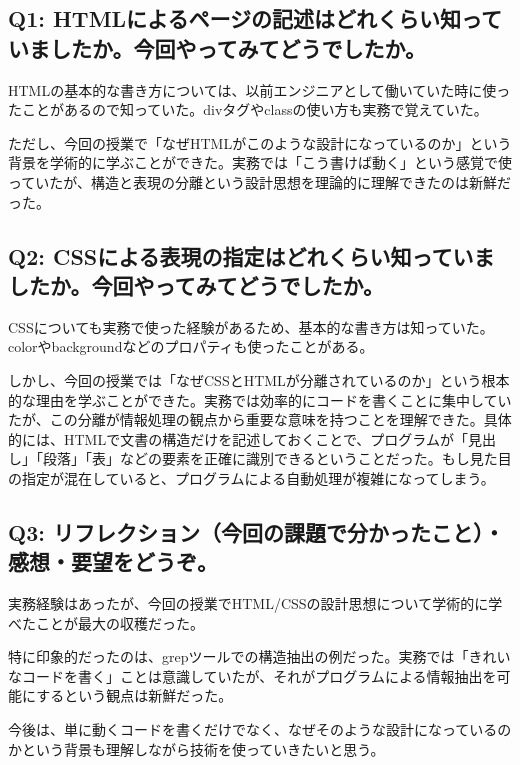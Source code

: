 \documentclass[12pt,a4j]{jarticle}
\begin{document}
\subsection{Q1: HTMLによるページの記述はどれくらい知っていましたか。今回やってみてどうでしたか。}

HTMLの基本的な書き方については、以前エンジニアとして働いていた時に使ったことがあるので知っていた。divタグやclassの使い方も実務で覚えていた。

ただし、今回の授業で「なぜHTMLがこのような設計になっているのか」という背景を学術的に学ぶことができた。実務では「こう書けば動く」という感覚で使っていたが、構造と表現の分離という設計思想を理論的に理解できたのは新鮮だった。

\subsection{Q2: CSSによる表現の指定はどれくらい知っていましたか。今回やってみてどうでしたか。}

CSSについても実務で使った経験があるため、基本的な書き方は知っていた。colorやbackgroundなどのプロパティも使ったことがある。

しかし、今回の授業では「なぜCSSとHTMLが分離されているのか」という根本的な理由を学ぶことができた。実務では効率的にコードを書くことに集中していたが、この分離が情報処理の観点から重要な意味を持つことを理解できた。具体的には、HTMLで文書の構造だけを記述しておくことで、プログラムが「見出し」「段落」「表」などの要素を正確に識別できるということだった。もし見た目の指定が混在していると、プログラムによる自動処理が複雑になってしまう。

\subsection{Q3: リフレクション（今回の課題で分かったこと）・感想・要望をどうぞ。}

実務経験はあったが、今回の授業でHTML/CSSの設計思想について学術的に学べたことが最大の収穫だった。

特に印象的だったのは、grepツールでの構造抽出の例だった。実務では「きれいなコードを書く」ことは意識していたが、それがプログラムによる情報抽出を可能にするという観点は新鮮だった。

今後は、単に動くコードを書くだけでなく、なぜそのような設計になっているのかという背景も理解しながら技術を使っていきたいと思う。
\end{document}
